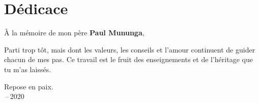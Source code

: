 \chapter*{Dédicace}
\thispagestyle{empty}

\vspace*{3cm}

\begin{center}

À la mémoire de mon père \textbf{Paul Mununga},

Parti trop tôt, mais dont les valeurs, les conseils et l'amour continuent de guider chacun de mes pas. Ce travail est le fruit des enseignements et de l'héritage que tu m'as laissés.

Repose en paix. \\ \,--\,2020
\end{center}

\vspace{1.5cm}
\begin{flushright}
\myName
\end{flushright}
